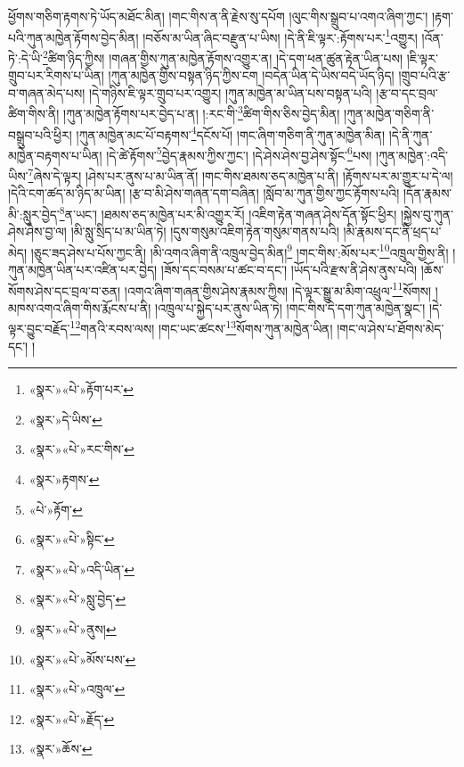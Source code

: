 ཕྱོགས་གཅིག་རྟགས་ཏེ་ཡོད་མཐོང་མིན། །གང་གིས་ན་ནི་རྗེས་སུ་དཔོག །ལུང་གིས་སྒྲུབ་པ་འགའ་ཞིག་ཀྱང་། །རྟག་པའི་ཀུན་མཁྱེན་རྟོགས་བྱེད་མིན། །བཅོས་མ་ཡིན་ཞིང་བརྫུན་པ་ཡིས། །དེ་ནི་ཇི་ལྟར་:རྟོགས་པར་\footnote{«སྣར་»«པེ་»རྟོག་པར་}འགྱུར། །འོན་ཏེ་:དེ་ཡི་\footnote{«སྣར་»དེ་ཡིས་}ཚིག་ཉིད་ཀྱིས། །གཞན་གྱིས་ཀུན་མཁྱེན་རྟོགས་འགྱུར་ན། །དེ་དག་ཕན་ཚུན་རྟེན་ཡིན་པས། །ཇི་ལྟར་གྲུབ་པར་རིགས་པ་ཡིན། །ཀུན་མཁྱེན་གྱིས་བསྟན་ཉིད་ཀྱིས་ངག །བདེན་ཡིན་དེ་ཡིས་བདེ་ཡོད་ཉིད། །གྲུབ་པའི་རྩ་བ་གཞན་མེད་པས། །དེ་གཉིས་ཇི་ལྟར་གྲུབ་པར་འགྱུར། །ཀུན་མཁྱེན་མ་ཡིན་པས་བསྟན་པའི། །རྩ་བ་དང་བྲལ་ཚིག་གིས་ནི། །ཀུན་མཁྱེན་རྟོགས་པར་བྱེད་པ་ན། །:རང་གི་\footnote{«སྣར་»«པེ་»རང་གིས་}ཚིག་གིས་ཅིས་བྱེད་མིན། །ཀུན་མཁྱེན་གཅིག་ནི་བསྒྲུབ་པའི་ཕྱིར། །ཀུན་མཁྱེན་མང་པོ་བརྟགས་\footnote{«སྣར་»རྟགས་}དངོས་པོ། །གང་ཞིག་གཅིག་ནི་ཀུན་མཁྱེན་མིན། །དེ་ནི་ཀུན་མཁྱེན་བརྟགས་པ་ཡིན། །དེ་ཚེ་རྟོགས་\footnote{«པེ་»རྟོག་}བྱེད་རྣམས་ཀྱིས་ཀྱང་། །དེ་ཤེས་ཤེས་བྱ་ཤེས་སྟོང་\footnote{«སྣར་»«པེ་»སྟིང་}པས། །ཀུན་མཁྱེན་:འདི་ཡིས་\footnote{«སྣར་»«པེ་»འདི་ཡིན་}ཞེས་དེ་ལྟར། །ཤེས་པར་ནུས་པ་མ་ཡིན་ནོ། །གང་གིས་ཐམས་ཅད་མཁྱེན་པ་ནི། །རྟོགས་པར་མ་གྱུར་པ་དེ་ལ། །དེའི་ངག་ཚད་མ་ཉིད་མ་ཡིན། །རྩ་བ་མི་ཤེས་གཞན་དག་བཞིན། །སློབ་མ་ཀུན་གྱིས་ཀྱང་རྟོགས་པའི། །དོན་རྣམས་མི་:སླུར་བྱེད་\footnote{«སྣར་»«པེ་»སླུ་བྱེད་}ན་ཡང་། །ཐམས་ཅད་མཁྱེན་པར་མི་འགྱུར་རོ། །འཇིག་རྟེན་གཞན་ཤེས་དོན་སྟོང་ཕྱིར། །སྐྱེས་བུ་ཀུན་ཤེས་ཤེས་བྱ་ལ། །མི་སླུ་སྲིད་པ་མ་ཡིན་ཏེ། །དུས་གསུམ་འཇིག་རྟེན་གསུམ་གནས་པའི། །མི་རྣམས་དང་ནི་ཕྲད་པ་མེད། །ཅུང་ཟད་ཤེས་པ་པོས་ཀྱང་ནི། །མི་འགའ་ཞིག་ནི་འཁྲུལ་བྱེད་མིན།\footnote{«སྣར་»«པེ་»ནུས།} །གང་གིས་:མོས་པར་\footnote{«སྣར་»«པེ་»མོས་པས་}འཁྲུལ་གྱིས་ནི། །ཀུན་མཁྱེན་ཡིན་པར་འཛིན་པར་བྱེད། །ཟོས་དང་བསམ་པ་ཚང་བ་དང་། །ཡོད་པའི་རྫས་ནི་ཤེས་ནུས་པའི། །ཆོས་སོགས་ཤེས་དང་བྲལ་བ་ཅན། །འགའ་ཞིག་གཞན་གྱིས་ཤེས་རྣམས་ཀྱིས། །དེ་ལྟར་སྒྱུ་མ་མིག་འཕྲུལ་\footnote{«སྣར་»«པེ་»འཁྲུལ་}སོགས། །མཁས་འགའ་ཞིག་གིས་རྨོངས་པ་ནི། །འཁྲུལ་པ་སྐྱེད་པར་ནུས་ཡིན་ཏེ། །གང་གིས་དེ་དག་ཀུན་མཁྱེན་སྣང་། །དེ་ལྟར་བྱུང་བརྗོད་\footnote{«སྣར་»«པེ་»རྗོད་}གནའི་རབས་ལས། །གང་ཡང་ཚངས་\footnote{«སྣར་»ཆོས་}སོགས་ཀུན་མཁྱེན་ཡིན། །གང་ལ་ཤེས་པ་ཐོགས་མེད་དང་། །
